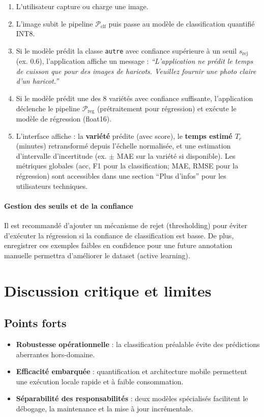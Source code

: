 \begin{enumerate}
	\item L'utilisateur capture ou charge une image.
	\item L'image subit le pipeline \(\mathcal{P}_{\text{clf}}\) puis passe au modèle de classification quantifié INT8.
	\item Si le modèle prédit la classe \texttt{autre} avec confiance supérieure à un seuil \(s_{\text{rej}}\) (ex. 0.6), l'application affiche un message : \emph{``L'application ne prédit le temps de cuisson que pour des images de haricots. Veuillez fournir une photo claire d'un haricot.''}
	\item Si le modèle prédit une des 8 variétés avec confiance suffisante, l'application déclenche le pipeline \(\mathcal{P}_{\text{reg}}\) (prétraitement pour régression) et exécute le modèle de régression (float16).
	\item L'interface affiche : la \textbf{variété} prédite (avec score), le \textbf{temps estimé $T_c$} (minutes) retransformé depuis l'échelle normalisée, et une estimation d'intervalle d'incertitude (ex. $\pm$ MAE sur la variété si disponible). Les métriques globales (acc, F1 pour la classification; MAE, RMSE pour la régression) sont accessibles dans une section ``Plus d'infos'' pour les utilisateurs techniques.
\end{enumerate}

\paragraph{Gestion des seuils et de la confiance}
Il est recommandé d'ajouter un mécanisme de rejet (thresholding) pour éviter d'exécuter la régression si la confiance de classification est basse. De plus, enregistrer ces exemples faibles en confidence pour une future annotation manuelle permettra d'améliorer le dataset (active learning).

\section{Discussion critique et limites}

\subsection{Points forts}
\begin{itemize}
	\item \textbf{Robustesse opérationnelle} : la classification préalable évite des prédictions aberrantes hors-domaine.
	\item \textbf{Efficacité embarquée} : quantification et architecture mobile permettent une exécution locale rapide et à faible consommation.
	\item \textbf{Séparabilité des responsabilités} : deux modèles spécialisés facilitent le débogage, la maintenance et la mise à jour incrémentale.
\end{itemize}

